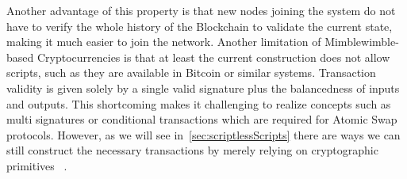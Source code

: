 Another advantage of this property is that new nodes joining the system do not have to verify the whole history of the Blockchain to validate the current state, making it much easier to join the network. 
Another limitation of Mimblewimble- based Cryptocurrencies is that at least the current construction does not allow scripts, such as they are available in Bitcoin or similar systems.
Transaction validity is given solely by a single valid signature plus the balancedness of inputs and outputs.
This shortcoming makes it challenging to realize concepts such as multi signatures or conditional transactions which are required for Atomic Swap protocols. However,
as we will see in~\ref{sec:scriptlessScripts} there are ways we can still construct the necessary transactions by merely relying on cryptographic primitives ~\cite{fuchsbauer2019aggregate}.